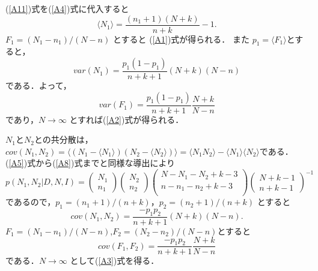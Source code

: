 (\ref{A11})式を(\ref{A4})式に代入すると
\begin{equation}
  \label{A12}
  \langle N_1 \rangle = \frac{(n_1 + 1)(N + k)}{n + k} - 1.
\end{equation}
$F_1 = (N_1 - n_1)/(N - n)$ とすると (\ref{A1})式が得られる．
また $p_1 = \langle F_1 \rangle$とすると，
\begin{equation}
  \label{A13}
  var(N_1) = \frac{p_1(1-p_1)}{n + k + 1}(N + k)(N-n)
\end{equation}
である．よって，
\begin{equation}
  \label{A14}
 var(F_1) = \frac{p_1(1-p_1)}{n + k + 1}\frac{N + k}{N-n} 
\end{equation}
であり，$N \rightarrow \infty$ とすれば(\ref{A2})式が得られる．

$N_1$と$N_2$との共分散は，$cov(N_1,N_2) = \langle (N_1 - \langle
N_1\rangle )(N_2 - \langle N_2\rangle )\rangle = \langle N_1
N_2\rangle - \langle N_1\rangle \langle N_2\rangle$である．
(\ref{A5})式から(\ref{A8})式までと同様な導出により
\begin{equation}
  \label{A15}
  p(N_1, N_2| D, N, I) =
  \left(
    \begin{array}{l}
      N_1\\
      n_1
    \end{array}
  \right)
  \left(
    \begin{array}{l}
      N_2\\
      n_2
    \end{array}
  \right)
  \left(
    \begin{array}{l}
      N - N_1 - N_2 + k - 3\\
      n - n_1 - n_2 + k - 3\\
    \end{array}
  \right)
  \left(
    \begin{array}{l}
      N + k - 1\\
      n + k - 1
    \end{array}
  \right)^{-1}
\end{equation}
であるので，$p_1 = (n_1 + 1)/(n + k)$，$p_2 = (n_2 + 1)/(n + k)$ とすると
\begin{equation}
  \label{A16}
  cov(N_1,N_2) = \frac{- p_1 p_2}{n + k + 1}(N + k)(N - n).
\end{equation}
$F_1 = (N_1 - n_1)/(N - n)$,$F_2 = (N_2 - n_2)/(N - n)$とすると
\begin{equation}
  \label{A17}
  cov(F_1,F_2) = \frac{- p_1 p_2}{n + k + 1}\frac{N + k}{N - n}
\end{equation}
である．$N \rightarrow \infty$ として(\ref{A3})式を得る．


